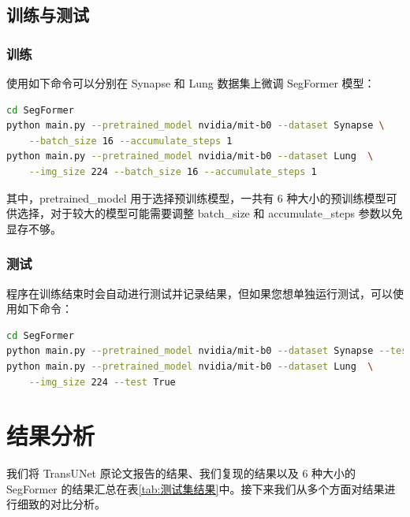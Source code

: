 \documentclass[hyperref,a4paper,UTF8]{ctexart}
\begin{document}
\subsection{训练与测试}

\subsubsection{训练}

使用如下命令可以分别在 Synapse 和 Lung 数据集上微调 SegFormer 模型：

\begin{lstlisting}[language=bash]
cd SegFormer
python main.py --pretrained_model nvidia/mit-b0 --dataset Synapse \
    --batch_size 16 --accumulate_steps 1
python main.py --pretrained_model nvidia/mit-b0 --dataset Lung  \
    --img_size 224 --batch_size 16 --accumulate_steps 1
\end{lstlisting}

其中，pretrained\_model 用于选择预训练模型，一共有 6 种大小的预训练模型可供选择，对于较大的模型可能需要调整 batch\_size 和 accumulate\_steps 参数以免显存不够。

\subsubsection{测试}

程序在训练结束时会自动进行测试并记录结果，但如果您想单独运行测试，可以使用如下命令：

\begin{lstlisting}[language=bash]
cd SegFormer
python main.py --pretrained_model nvidia/mit-b0 --dataset Synapse --test True
python main.py --pretrained_model nvidia/mit-b0 --dataset Lung  \
    --img_size 224 --test True
\end{lstlisting}

\section{结果分析}

我们将 TransUNet 原论文报告的结果、我们复现的结果以及 6 种大小的 SegFormer 的结果汇总在表\ref{tab:测试集结果}中。接下来我们从多个方面对结果进行细致的对比分析。
\end{document}
